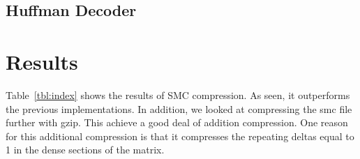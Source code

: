 \subsection{Huffman Decoder}

\section{Results}
\label{sec:smc_discussion}

Table~\ref{tbl:index}  shows the results of SMC compression. As seen, it outperforms the previous implementations. In addition, we looked at compressing the smc file further with gzip. This achieve a good deal of addition compression. One reason for this additional compression is that it compresses the repeating deltas equal to 1 in the dense sections of the matrix.
